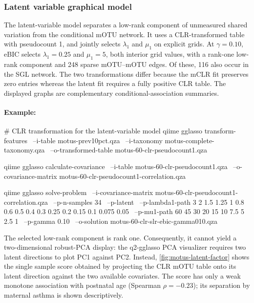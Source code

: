 \documentclass[11pt,a4paper]{article}
\begin{document}
\subsubsection{Latent variable graphical model}
\label{sec:metagenomics-slr}

The latent-variable model separates a low-rank component of unmeasured shared
variation from the conditional mOTU network. It uses a CLR-transformed table with
pseudocount 1, and jointly selects $\lambda_1$ and $\mu_1$ on explicit grids.
At $\gamma=0.10$, eBIC selects $\lambda_1=0.25$ and $\mu_1=5$, both interior
grid values, with a rank-one low-rank component and 248 sparse mOTU--mOTU
edges. Of these, 116 also occur in the SGL network. The two transformations
differ because the mCLR fit preserves zero entries whereas the latent fit
requires a fully positive CLR table. The displayed graphs are complementary
conditional-association summaries.

\paragraph{Example:} \mbox{}
\begin{PseudoCode}
# CLR transformation for the latent-variable model
qiime gglasso transform-features \
    --i-table motus-prev10pct.qza \
    --i-taxonomy motus-complete-taxonomy.qza \
    --o-transformed-table motus-60-clr-pseudocount1.qza

qiime gglasso calculate-covariance \
    --i-table motus-60-clr-pseudocount1.qza \
    --o-covariance-matrix motus-60-clr-pseudocount1-correlation.qza

qiime gglasso solve-problem \
    --i-covariance-matrix motus-60-clr-pseudocount1-correlation.qza \
    --p-n-samples 34 \
    --p-latent \
    --p-lambda1-path 3 2 1.5 1.25 1 0.8 0.6 0.5 0.4 0.3 0.25 0.2 0.15 0.1 0.075 0.05 \
    --p-mu1-path 60 45 30 20 15 10 7.5 5 2.5 1 \
    --p-gamma 0.10 \
    --o-solution motus-60-clr-slr-ebic-gamma010.qza
\end{PseudoCode}

The selected low-rank component is rank one. Consequently, it cannot yield a
two-dimensional robust-PCA display: the q2-gglasso PCA visualizer requires two
latent directions to plot PC1 against PC2. Instead,
\autoref{fig:motus-latent-factor} shows the single sample score obtained by
projecting the CLR mOTU table onto its latent direction against the two
available covariates. The score has only a weak monotone association with postnatal age
(Spearman $\rho=-0.23$); its separation by maternal asthma is shown
descriptively.
\end{document}
